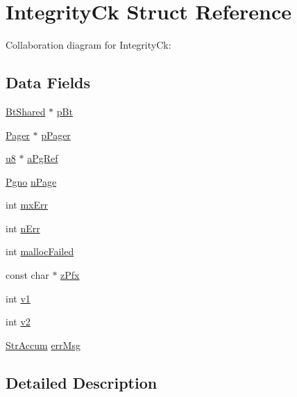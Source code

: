 \hypertarget{struct_integrity_ck}{}\section{Integrity\+Ck Struct Reference}
\label{struct_integrity_ck}


Collaboration diagram for Integrity\+Ck\+:
\subsection*{Data Fields}
\begin{DoxyCompactItemize}
\item 
\hyperlink{struct_bt_shared}{Bt\+Shared} $\ast$ \hyperlink{struct_integrity_ck_a2bc66d19c064bb25ff335241f8c621df}{p\+Bt}
\item 
\hyperlink{struct_pager}{Pager} $\ast$ \hyperlink{struct_integrity_ck_a916447fa61ba4e11cc93d571a66d3aaf}{p\+Pager}
\item 
\hyperlink{sqlite3_8c_a74a0f6424ae628af25f23f0a35f6ead3}{u8} $\ast$ \hyperlink{struct_integrity_ck_aeddb58305f7868c35e8aa73c47eb408c}{a\+Pg\+Ref}
\item 
\hyperlink{sqlite3_8c_aec0c653e8dd16e4639caf2f8ea54f55c}{Pgno} \hyperlink{struct_integrity_ck_a7c5c75401b248c3b69ec443ede680c30}{n\+Page}
\item 
int \hyperlink{struct_integrity_ck_a3e55f72c462ad39e133ce8ec76df17a9}{mx\+Err}
\item 
int \hyperlink{struct_integrity_ck_a60ebed73c4dbe105fdc4be21a01fd09c}{n\+Err}
\item 
int \hyperlink{struct_integrity_ck_a7a8a4eba8ff82d59f2874505949b36f4}{malloc\+Failed}
\item 
const char $\ast$ \hyperlink{struct_integrity_ck_acddf8038b96fe7c847581661451d4667}{z\+Pfx}
\item 
int \hyperlink{struct_integrity_ck_ac3f9ff4294615df8b7e9684b7d6fddc7}{v1}
\item 
int \hyperlink{struct_integrity_ck_aa517e2fff4a8c9cba11391ca12f91803}{v2}
\item 
\hyperlink{struct_str_accum}{Str\+Accum} \hyperlink{struct_integrity_ck_a6caf852b25fbc8f19a715f35ef7d0e97}{err\+Msg}
\end{DoxyCompactItemize}


\subsection{Detailed Description}


